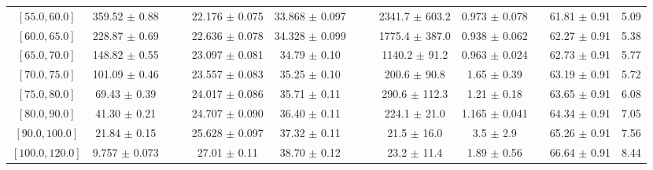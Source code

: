 \begin{tabular}{c||c|c|c|c|c|c|c|c|c|c|c||c}
$[55.0, 60.0]$ & 359.52 $\pm$ 0.88 &  &  & 22.176 $\pm$ 0.075 & 33.868 $\pm$ 0.097 &  &  & 2341.7 $\pm$ 603.2 & 0.973 $\pm$ 0.078 &  & 61.81 $\pm$ 0.91 & 5.09\\
$[60.0, 65.0]$ & 228.87 $\pm$ 0.69 &  &  & 22.636 $\pm$ 0.078 & 34.328 $\pm$ 0.099 &  &  & 1775.4 $\pm$ 387.0 & 0.938 $\pm$ 0.062 &  & 62.27 $\pm$ 0.91 & 5.38\\
$[65.0, 70.0]$ & 148.82 $\pm$ 0.55 &  &  & 23.097 $\pm$ 0.081 & 34.79 $\pm$ 0.10 &  &  & 1140.2 $\pm$ 91.2 & 0.963 $\pm$ 0.024 &  & 62.73 $\pm$ 0.91 & 5.77\\
$[70.0, 75.0]$ & 101.09 $\pm$ 0.46 &  &  & 23.557 $\pm$ 0.083 & 35.25 $\pm$ 0.10 &  &  & 200.6 $\pm$ 90.8 & 1.65 $\pm$ 0.39 &  & 63.19 $\pm$ 0.91 & 5.72\\
$[75.0, 80.0]$ & 69.43 $\pm$ 0.39 &  &  & 24.017 $\pm$ 0.086 & 35.71 $\pm$ 0.11 &  &  & 290.6 $\pm$ 112.3 & 1.21 $\pm$ 0.18 &  & 63.65 $\pm$ 0.91 & 6.08\\
$[80.0, 90.0]$ & 41.30 $\pm$ 0.21 &  &  & 24.707 $\pm$ 0.090 & 36.40 $\pm$ 0.11 &  &  & 224.1 $\pm$ 21.0 & 1.165 $\pm$ 0.041 &  & 64.34 $\pm$ 0.91 & 7.05\\
$[90.0, 100.0]$ & 21.84 $\pm$ 0.15 &  &  & 25.628 $\pm$ 0.097 & 37.32 $\pm$ 0.11 &  &  & 21.5 $\pm$ 16.0 & 3.5 $\pm$ 2.9 &  & 65.26 $\pm$ 0.91 & 7.56\\
$[100.0, 120.0]$ & 9.757 $\pm$ 0.073 &  &  & 27.01 $\pm$ 0.11 & 38.70 $\pm$ 0.12 &  &  & 23.2 $\pm$ 11.4 & 1.89 $\pm$ 0.56 &  & 66.64 $\pm$ 0.91 & 8.44\\
\end{tabular}

